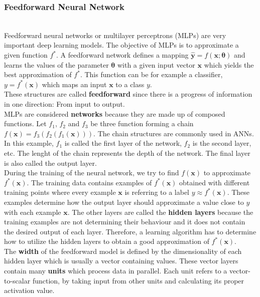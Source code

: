 
\subsubsection{Feedforward Neural Network}~\\

Feedforward neural networks or multilayer perceptrons (MLPs) are very important
deep learning models. The objective of MLPs is to approximate a given function
$f^{*}$. A feedforward network defines a mapping $\bm{\hat{y}} = f(\bm{x};
\bm{\theta})$ and learns the values of the parameter $\bm{\theta}$ with a given
input vector $\bm{x}$ which yields the best approximation of $f^{*}$. This
function can be for example a classifier, $y = f^{*}(\bm{x})$ which maps an
input $\bm{x}$ to a class $y$.\\

These structures are called \textbf{feedforward} since there is a progress of
information in one direction: From input to output.\\

MLPs are considered \textbf{networks} because they are made up of composed
functions. Let $f_{1}$, $f_{2}$ and $f_{3}$ be three function forming a chain
$f(\bm{x}) = f_{3}(f_{2}(f_{1}(\bm{x})))$. The chain structures are commonly
used in ANNs. In this example, $f_{1}$ is called the first layer of the network,
$f_{2}$ is the second layer, etc. The lenght of the chain represents the depth
of the network. The final layer is also called the output layer.\\

During the training of the neural network, we try to find $f(\bm{x})$ to
approximate $f^{*}(\bm{x})$. The training data contains examples of
$f^{*}(\bm{x})$ obtained with different training points where every example
$\bm{x}$ is referring to a label $y \approx f^{*}(\bm{x})$. These examples
determine how the output layer should approximate a value close to $y$ with each
example $\bm{x}$. The other layers are called the \textbf{hidden layers} because
the training examples are not determining their behaviour and it does not
contain the desired output of each layer. Therefore, a learning algorithm has to
determine how to utilize the hidden layers to obtain a good approximation of
$f^{*}(\bm{x})$.\\

The \textbf{width} of the feedforward model is defined by the dimensionality of
each hidden layer which is usually a vector containing values. These vector
layers contain many \textbf{units} which process data in parallel. Each unit
refers to a vector-to-scalar function, by taking input from other units and
calculating its proper activation value.\\

